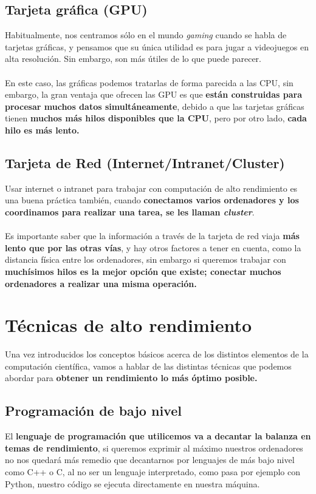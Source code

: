\subsection{Tarjeta gráfica (GPU)}
Habitualmente, nos centramos sólo en el mundo \textit{gaming} cuando se habla de tarjetas gráficas, y pensamos que su única utilidad es para jugar a videojuegos en alta resolución. Sin embargo, son más útiles de lo que puede parecer. \\ \\
En este caso, las gráficas podemos tratarlas de forma parecida a las CPU, sin embargo, la gran ventaja que ofrecen las GPU es que \textbf{están construidas para procesar muchos datos simultáneamente}, debido a que las tarjetas gráficas tienen \textbf{muchos más hilos disponibles que la CPU}, pero por otro lado, \textbf{cada hilo es más lento.}

\subsection{Tarjeta de Red (Internet/Intranet/Cluster)}
Usar internet o intranet para trabajar con computación de alto rendimiento es una buena práctica también, cuando \textbf{conectamos varios ordenadores y los coordinamos para realizar una tarea, se les llaman \textit{cluster}}. \\ \\
Es importante saber que la información a través de la tarjeta de red viaja \textbf{más lento que por las otras vías}, y hay otros factores a tener en cuenta, como la distancia física entre los ordenadores, sin embargo si queremos trabajar con \textbf{muchísimos hilos es la mejor opción que existe; conectar muchos ordenadores a realizar una misma operación.}

\section{Técnicas de alto rendimiento}

Una vez introducidos los conceptos básicos acerca de los distintos elementos de la computación científica, vamos a hablar de las distintas técnicas que podemos abordar para \textbf{obtener un rendimiento lo más óptimo posible.}

\subsection{Programación de bajo nivel}
El \textbf{lenguaje de programación que utilicemos va a decantar la balanza en temas de rendimiento}, si queremos exprimir al máximo nuestros ordenadores no nos quedará más remedio que decantarnos por lenguajes de más bajo nivel como C++ o C, al no ser un lenguaje interpretado, como pasa por ejemplo con Python, nuestro código se ejecuta directamente en nuestra máquina.

